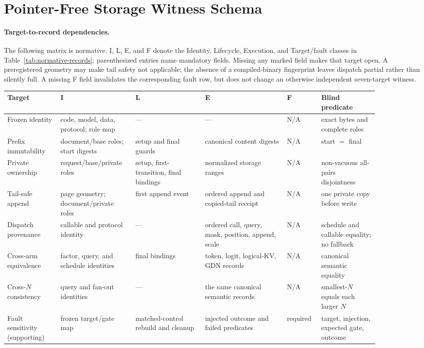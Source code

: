 \documentclass{article}
\begin{document}
\section{Pointer-Free Storage Witness Schema}
\label{app:storage-schema}

\paragraph{Target-to-record dependencies.}
The following matrix is normative.  I, L, E, and F denote the Identity,
Lifecycle, Execution, and Target/fault classes in Table~\ref{tab:normative-records};
parenthesized entries name mandatory fields.  Missing any marked field makes
that target open.  A preregistered geometry may make tail safety not applicable;
the absence of a compiled-binary fingerprint leaves dispatch partial rather
than silently full.  A missing F field invalidates the corresponding fault row,
but does not change an otherwise independent seven-target witness.

\begin{center}
\scriptsize
\setlength{\tabcolsep}{2.5pt}
\begin{tabular}{@{}p{0.13\linewidth}p{0.17\linewidth}p{0.17\linewidth}p{0.20\linewidth}p{0.08\linewidth}p{0.14\linewidth}@{}}
\toprule
Target & I & L & E & F & Blind predicate \\
\midrule
Frozen identity & code, model, data, protocol; role map & --- & --- & N/A & exact bytes and complete roles \\
Prefix immutability & document/base roles; start digests & setup and final guards & canonical content digests & N/A & start $=$ final \\
Private ownership & request/base/private roles & setup, first-transition, final bindings & normalized storage ranges & N/A & non-vacuous all-pairs disjointness \\
Tail-safe append & page geometry; document/private roles & first append event & ordered append and copied-tail receipt & N/A & one private copy before write \\
Dispatch provenance & callable and protocol identity & --- & ordered call, query, mask, position, append, scale & N/A & schedule and callable equality; no fallback \\
Cross-arm equivalence & factor, query, and schedule identities & final bindings & token, logit, logical-KV, GDN records & N/A & canonical semantic equality \\
Cross-$N$ consistency & query and fan-out identities & --- & the same canonical semantic records & N/A & smallest-$N$ equals each larger $N$ \\
Fault sensitivity (supporting) & frozen target/gate map & matched-control rebuild and cleanup & injected outcome and failed predicates & required & target, injection, expected gate, outcome \\
\bottomrule
\end{tabular}
\end{center}
\end{document}
